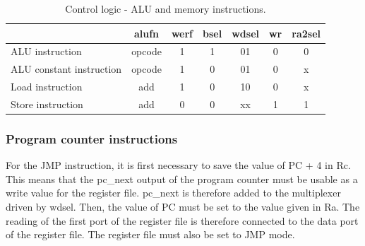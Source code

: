 \begin{table}[H]
    \centering
    \begin{tabular}{|l|c|c|c|c|c|c|}
    \hline
    \rowcolor[HTML]{DAE8FC} 
    \multicolumn{1}{|c|}{\cellcolor[HTML]{DAE8FC}\textbf{Instruction}} & \textbf{alufn} & \textbf{werf} & \textbf{bsel} & \multicolumn{1}{l|}{\cellcolor[HTML]{DAE8FC}\textbf{wdsel}} & \multicolumn{1}{l|}{\cellcolor[HTML]{DAE8FC}\textbf{wr}} & \multicolumn{1}{l|}{\cellcolor[HTML]{DAE8FC}\textbf{ra2sel}} \\ \hline
    ALU instruction                                                    & opcode         & 1             & 1             & 01                                                          & 0                                                        & 0                                                            \\ \hline
    ALU constant instruction                                           & opcode         & 1             & 0             & 01                                                          & 0                                                        & x                                                            \\ \hline
    Load instruction                                                   & add            & 1             & 0             & 10                                                          & 0                                                        & x                                                            \\ \hline
    Store instruction                                                  & add            & 0             & 0             & xx                                                          & 1                                                        & 1                                                            \\ \hline
    \end{tabular}
    \caption{Control logic - ALU and memory instructions.}
    \label{tab:cl/dm}
\end{table}

\subsubsection*{Program counter instructions}

For the JMP instruction, it is first necessary to save the value of PC + 4 in Rc. This means that 
the pc\_next output of the program counter must be usable as
a write value for the register 
file. pc\_next is therefore added to the multiplexer driven by wdsel. Then, the value of PC must be 
set to the value given in Ra. The reading of the first port of the register file is therefore 
connected to the data port of the register file. The register file must also be set to JMP mode.

